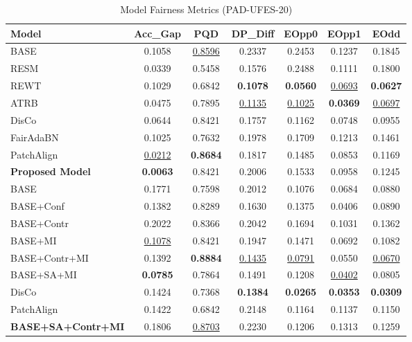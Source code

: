 \begin{table}[h]
\centering
\caption{Model Fairness Metrics (PAD-UFES-20)}
\label{tab:cross_model_fairness}
\begin{tabular}{|l|c|c|c|c|c|c|}
\hline
Model & Acc\_Gap & PQD & DP\_Diff & EOpp0 & EOpp1 & EOdd \\
\hline
BASE & 0.1058 & \underline{0.8596} & 0.2337 & 0.2453 & 0.1237 & 0.1845 \\
RESM & 0.0339 & 0.5458 & 0.1576 & 0.2488 & 0.1111 & 0.1800 \\
REWT & 0.1029 & 0.6842 & \textbf{0.1078} & \textbf{0.0560} & \underline{0.0693} & \textbf{0.0627} \\
ATRB & 0.0475 & 0.7895 & \underline{0.1135} & \underline{0.1025} & \textbf{0.0369} & \underline{0.0697} \\
DisCo & 0.0644 & 0.8421 & 0.1757 & 0.1162 & 0.0748 & 0.0955 \\
FairAdaBN & 0.1025 & 0.7632 & 0.1978 & 0.1709 & 0.1213 & 0.1461 \\
PatchAlign & \underline{0.0212} & \textbf{0.8684} & 0.1817 & 0.1485 & 0.0853 & 0.1169 \\
\textbf{Proposed Model} & \textbf{0.0063} & 0.8421 & 0.2006 & 0.1533 & 0.0958 & 0.1245 \\
\hline
BASE & 0.1771 & 0.7598 & 0.2012 & 0.1076 & 0.0684 & 0.0880 \\
BASE+Conf & 0.1382 & 0.8289 & 0.1630 & 0.1375 & 0.0406 & 0.0890 \\
BASE+Contr & 0.2022 & 0.8366 & 0.2042 & 0.1694 & 0.1031 & 0.1362 \\
BASE+MI & \underline{0.1078} & 0.8421 & 0.1947 & 0.1471 & 0.0692 & 0.1082 \\
BASE+Contr+MI & 0.1392 & \textbf{0.8884} & \underline{0.1435} & \underline{0.0791} & 0.0550 & \underline{0.0670} \\
BASE+SA+MI & \textbf{0.0785} & 0.7864 & 0.1491 & 0.1208 & \underline{0.0402} & 0.0805 \\
DisCo & 0.1424 & 0.7368 & \textbf{0.1384} & \textbf{0.0265} & \textbf{0.0353} & \textbf{0.0309} \\
PatchAlign & 0.1422 & 0.6842 & 0.2148 & 0.1164 & 0.1137 & 0.1150 \\
\textbf{BASE+SA+Contr+MI} & 0.1806 & \underline{0.8703} & 0.2230 & 0.1206 & 0.1313 & 0.1259 \\
\hline
\end{tabular}
\end{table}


